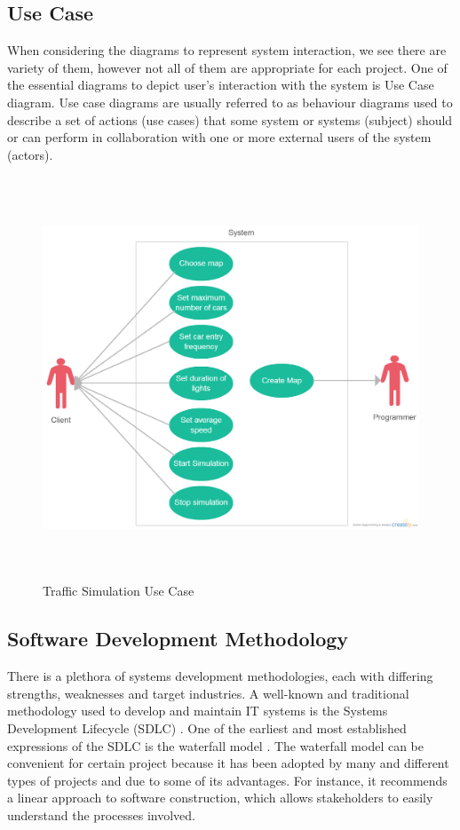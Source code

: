 \subsection{Use Case}

When considering the diagrams to represent system interaction, we see there are variety of them, however not all of them are appropriate for each project. One of the essential diagrams to depict user's interaction with the system is Use Case diagram. Use case diagrams are usually referred to as behaviour diagrams used to describe a set of actions (use cases) that some system or systems (subject) should or can perform in collaboration with one or more external users of the system (actors)\cite{umlucd}.\newline
 
\begin{figure}[H]
\includegraphics[width=12cm, height=12cm]{pics/useCase}
\centering
\caption{Traffic Simulation Use Case}
\end{figure}

\subsection{Software Development Methodology}
\indent There is a plethora of systems development methodologies, each with differing strengths, weaknesses and target industries. A well-known and traditional methodology used to develop and maintain IT systems is the Systems Development Lifecycle (SDLC) \cite{hoff}. One of the earliest and most established expressions of the SDLC is the waterfall model \cite{Sch95}. The waterfall model can be convenient for certain project because it has been adopted by many and different types of projects and due to some of its advantages. For instance, it recommends a linear approach to software construction, which allows stakeholders to easily understand the processes involved. \newline

